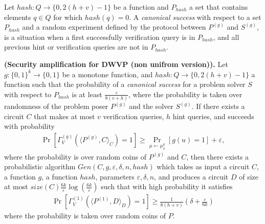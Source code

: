 Let $hash : Q \rightarrow \{0, 2(h+v)-1 \}$ be a function and $P_{hash}$ a set that contains elements $q \in Q$ for which $hash(q) = 0$.
A \textit{canonical success} with respect to a set $P_{hash}$ and
a random experiment defined by the protocol between $P^{(g)}$ and $S^{(g)}$,
is a situation when a first successfully verification query is in $P_{hash}$,
and all previous hint or verification queries are not in $P_{hash}$.
%
%
\begin{theorem} {\textbf{(Security amplification for DWVP (non unifrom version)).}}
  Let $g: \{0,1\}^k \rightarrow \{0,1\}$ be a monotone function, and $hash:Q \rightarrow \{0,2(h+v)-1\}$ a function such that
  the probability of a \textit{canonical success} for a problem solver $S$ with respect to $P_{hash}$ is at least $\frac{\varepsilon}{8\left(v + h\right)}$,
  where the probability is taken over randomness of the problem poser $P^{(g)}$ and the solver $S^{(g)}$.
  If there exists a circuit $C$ that makes at most $v$ verification queries, $h$ hint queries,
  and succeeds with probability
  \begin{align}
    \Pr_{}[\Gamma_{V}^{(g)}( \langle P^{(g)},C \rangle_C ) = 1] \geq \Pr_{\mu \leftarrow \mu_{\delta}^{k}}[g(u) = 1] + \varepsilon ,
  \end{align}
  where the probability is over random coins of $P^{(g)}$ and $C$,
  then there exists a probabilistic algorithm $Gen(C, g, \varepsilon, \delta, n, hash)$ which takes as input a circuit $C$, a function $g$, a function $hash$,
  parameters $\varepsilon, \delta, n$, and produces a circuit $D$ of size at most $ size(C) \frac{6k}{\varepsilon} \log(\frac{6k}{\varepsilon}) $
  such that with high probability it satisfies
  \begin{align}
    \Pr_{}[\Gamma_V^{(1)} \left( \langle P^{(1)} ,D \rangle_D \right) = 1] \geq \frac{1}{8(h+v)} \left( \delta + \frac{\varepsilon}{6k} \right)
  \end{align}
  where the probability is taken over random coins of $P$.
\end{theorem}


